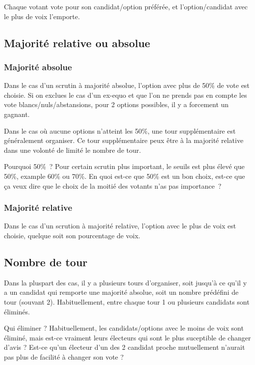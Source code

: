 \documentclass[../report]{subfiles}
\begin{document}
  Chaque votant vote pour son candidat/option préférée, et l'option/candidat avec le plus de
  voix l'emporte.
  
  \subsection{Majorité relative ou absolue}
  \subsubsection{Majorité absolue}
  Dans le cas d'un scrutin à majorité absolue, l'option avec plus de 50\% de vote est choisie.
  Si on exclues le cas d'un ex-equo et que l'on ne prends pas en compte les vote 
  blancs/nuls/abstansions, pour 2 options possibles, il y a forcement un gagnant.
  
  Dans le cas où aucune options n'atteint les 50\%, une tour supplémentaire est généralement
  organiser.
  Ce tour supplémentaire peux être à la majorité relative dans une volonté de limité le nombre
  de tour.
  
  \begin{nota}{Pourquoi 50\%~?}
    Pour certain scrutin plus important, le seuils est plus élevé que 50\%, example 60\% ou 70\%. 
    En quoi est-ce que 50\% est un bon choix, est-ce que ça veux dire que le choix de la moitié
    des votants n'as pas importance~? 
  \end{nota}
  
  \subsubsection{Majorité relative}
  Dans le cas d'un scrution à majorité relative, l'option avec le plus de voix est choisie, 
  quelque soit son pourcentage de voix.
  
  \subsection{Nombre de tour}
  
  Dans la pluspart des cas, il y a plusieurs tours d'organiser, soit jusqu'à ce qu'il y a 
  un candidat qui remporte une majorité absolue, soit un nombre prédéfini de tour (souvant 2).
  Habituellement, entre chaque tour 1 ou plusieurs candidats sont éliminés.
  
  \begin{nota}{Qui éliminer ?}
    Habituellement, les candidats/options avec le moins de voix sont éliminé, mais
    est-ce vraiment leurs électeurs qui sont le plus suceptible de changer d'avis ?
    Est-ce qu'un électeur d'un des 2 candidat proche mutuellement n'aurait pas plus
    de facilité à changer son vote ?
  \end{nota}
  
\end{document}
